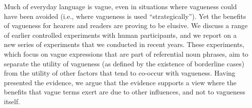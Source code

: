 Much of everyday language is vague, even in situations where vagueness could have been avoided (i.e., where vagueness is used ``strategically''). Yet the benefits of vagueness for hearers and readers are proving to be elusive. We discuss a range of earlier controlled experiments with human participants, and we report on a new series of experiments that we conducted in recent years. These experiments, which focus on vague expressions that are part of referential noun phrases, aim to separate the utility of vagueness (as defined by the existence of borderline cases) from the utility of other factors that tend to co-occur with vagueness. Having presented the evidence, we argue that the evidence supports a view where the benefits that vague terms exert are due to other influences, and not to vagueness itself.
